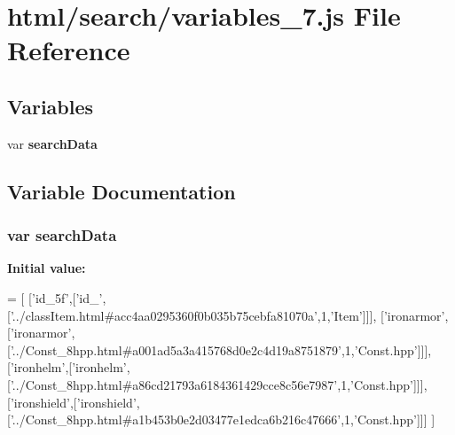 \section{html/search/variables\-\_\-7.js File Reference}
\label{variables__7_8js}
\subsection*{Variables}
\begin{DoxyCompactItemize}
\item 
var {\bf search\-Data}
\end{DoxyCompactItemize}


\subsection{Variable Documentation}
\subsubsection[{search\-Data}]{\setlength{\rightskip}{0pt plus 5cm}var search\-Data}\label{variables__7_8js_ad01a7523f103d6242ef9b0451861231e}
{\bfseries Initial value\-:}
\begin{DoxyCode}
=
[
  [\textcolor{stringliteral}{'id\_5f'},[\textcolor{stringliteral}{'id\_'},[\textcolor{stringliteral}{'../classItem.html#acc4aa0295360f0b035b75cebfa81070a'},1,\textcolor{stringliteral}{'Item'}]]],
  [\textcolor{stringliteral}{'ironarmor'},[\textcolor{stringliteral}{'ironarmor'},[\textcolor{stringliteral}{'../Const\_8hpp.html#a001ad5a3a415768d0e2c4d19a8751879'},1,\textcolor{stringliteral}{'Const.hpp'}]]],
  [\textcolor{stringliteral}{'ironhelm'},[\textcolor{stringliteral}{'ironhelm'},[\textcolor{stringliteral}{'../Const\_8hpp.html#a86cd21793a6184361429cce8c56e7987'},1,\textcolor{stringliteral}{'Const.hpp'}]]],
  [\textcolor{stringliteral}{'ironshield'},[\textcolor{stringliteral}{'ironshield'},[\textcolor{stringliteral}{'../Const\_8hpp.html#a1b453b0e2d03477e1edca6b216c47666'},1,\textcolor{stringliteral}{'Const.hpp'}]]]
]
\end{DoxyCode}
